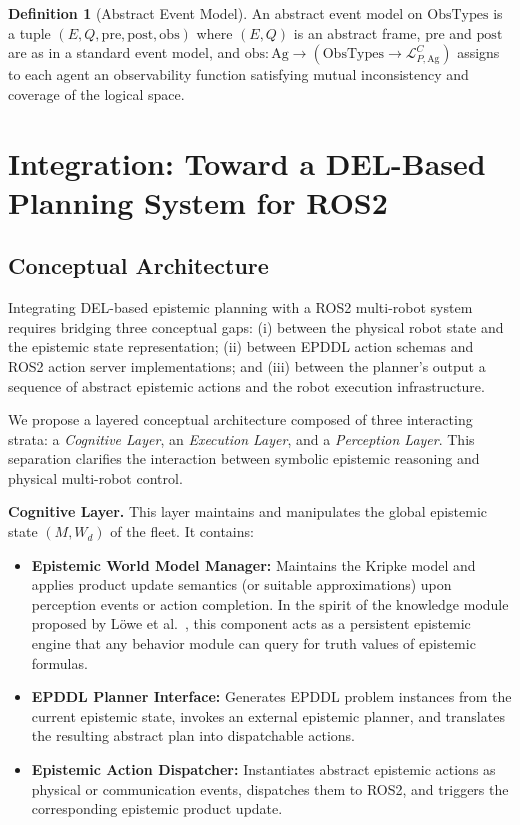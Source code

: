 \documentclass[12pt,a4paper]{article}
\theoremstyle{definition}
\newtheorem{definition}{Definition}[section]
\theoremstyle{plain}
\begin{document}
\begin{definition}[Abstract Event Model]
An abstract event model on $\mathrm{ObsTypes}$ is a tuple $(E, Q, \mathrm{pre}, \mathrm{post},
\mathrm{obs})$ where $(E, Q)$ is an abstract frame, $\mathrm{pre}$ and $\mathrm{post}$ are as
in a standard event model, and $\mathrm{obs} : \mathrm{Ag} \to (\mathrm{ObsTypes} \to
\mathcal{L}^C_{P,\mathrm{Ag}})$ assigns to each agent an observability function satisfying
mutual inconsistency and coverage of the logical space.
\end{definition}

\newpage
\section{Integration: Toward a DEL-Based Planning System for ROS2}
\label{sec:integration}

\subsection{Conceptual Architecture}

Integrating DEL-based epistemic planning with a ROS2 multi-robot system requires bridging three
conceptual gaps: (i) between the physical robot state and the epistemic state representation;
(ii) between EPDDL action schemas and ROS2 action server implementations; and (iii) between the
planner's output a sequence of abstract epistemic actions and the robot execution
infrastructure.

We propose a layered conceptual architecture composed of three interacting strata:
a \emph{Cognitive Layer}, an \emph{Execution Layer}, and a \emph{Perception Layer}.
This separation clarifies the interaction between symbolic epistemic reasoning and
physical multi-robot control.

\textbf{Cognitive Layer.}
This layer maintains and manipulates the global epistemic state $(M, W_d)$ of the fleet.
It contains:

\begin{itemize}
\item \textbf{Epistemic World Model Manager:} Maintains the Kripke model and applies
product update semantics (or suitable approximations) upon perception events or
action completion. In the spirit of the knowledge module proposed by L{\"o}we et
al.~\cite{lowe2010planning}, this component acts as a persistent epistemic engine
that any behavior module can query for truth values of epistemic formulas.

\item \textbf{EPDDL Planner Interface:} Generates EPDDL problem instances from the
current epistemic state, invokes an external epistemic planner, and translates the
resulting abstract plan into dispatchable actions.

\item \textbf{Epistemic Action Dispatcher:} Instantiates abstract epistemic actions
as physical or communication events, dispatches them to ROS2, and triggers the
corresponding epistemic product update.
\end{itemize}
\end{document}
